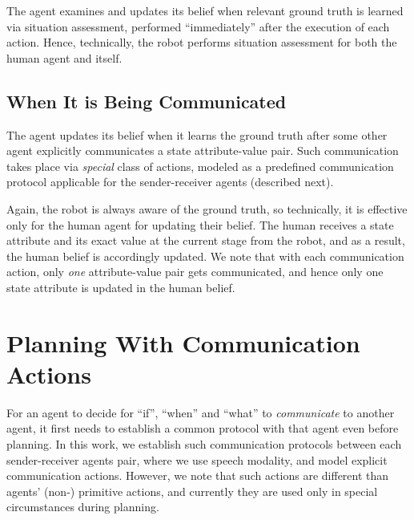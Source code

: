 \documentclass[letterpaper]{article} %
\begin{document}
The agent examines and updates its belief when relevant ground truth is learned via situation assessment, performed ``immediately'' after the execution of each action. Hence, technically, the robot performs situation assessment for both the human agent and itself.

\subsection{When It is Being Communicated}
The agent updates its belief when it learns the ground truth after some other agent explicitly communicates a state attribute-value pair. 
Such communication takes place via \textit{special} class of actions, modeled as a predefined communication protocol applicable for the sender-receiver agents (described next). 

Again, the robot is always aware of the ground truth, so technically, it is effective only for the human agent for updating their belief.
% 
The human receives a state attribute and its exact value at the current stage from the robot, and as a result, the human belief is accordingly updated. 
We note that with each communication action, only {\em one} attribute-value pair gets communicated, and hence only one state attribute is updated in the human belief.


\section{Planning With Communication Actions}
For an agent to decide for ``if'', ``when'' and ``what'' to \textit{communicate} to another agent, it first needs to establish a common protocol with that agent even before planning.  
In this work, we establish such communication protocols between each sender-receiver agents pair, where we use speech modality, and model explicit communication actions. 
However, we note that such actions are different than agents' (non-) primitive actions, and currently they are used only in special circumstances during planning.
\end{document}
